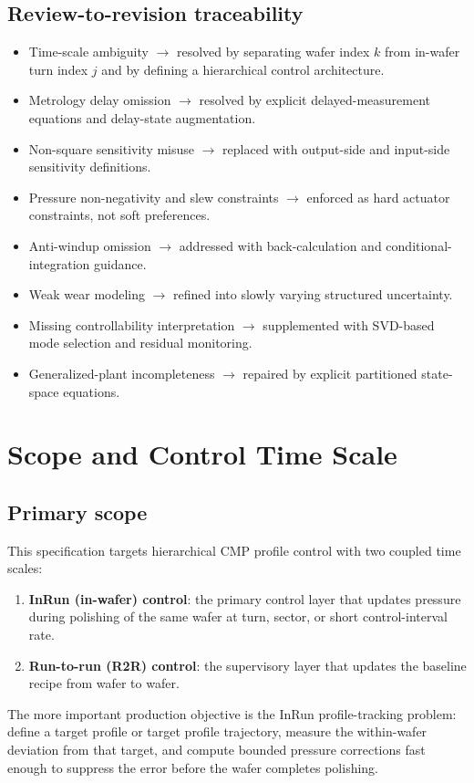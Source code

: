 \documentclass[11pt,a4paper]{article}
\begin{document}
\subsection{Review-to-revision traceability}
\begin{itemize}[leftmargin=1.5em]
\item Time-scale ambiguity $\rightarrow$ resolved by separating wafer index $k$ from in-wafer turn index $j$ and by defining a hierarchical control architecture.
\item Metrology delay omission $\rightarrow$ resolved by explicit delayed-measurement equations and delay-state augmentation.
\item Non-square sensitivity misuse $\rightarrow$ replaced with output-side and input-side sensitivity definitions.
\item Pressure non-negativity and slew constraints $\rightarrow$ enforced as hard actuator constraints, not soft preferences.
\item Anti-windup omission $\rightarrow$ addressed with back-calculation and conditional-integration guidance.
\item Weak wear modeling $\rightarrow$ refined into slowly varying structured uncertainty.
\item Missing controllability interpretation $\rightarrow$ supplemented with SVD-based mode selection and residual monitoring.
\item Generalized-plant incompleteness $\rightarrow$ repaired by explicit partitioned state-space equations.\end{itemize}

\section{Scope and Control Time Scale}
\subsection{Primary scope}
This specification targets hierarchical CMP profile control with two coupled time scales:
\begin{enumerate}[leftmargin=1.6em]
\item \textbf{InRun (in-wafer) control}: the primary control layer that updates pressure during polishing of the same wafer at turn, sector, or short control-interval rate.
\item \textbf{Run-to-run (R2R) control}: the supervisory layer that updates the baseline recipe from wafer to wafer.
\end{enumerate}
The more important production objective is the InRun profile-tracking problem: define a target profile or target profile trajectory, measure the within-wafer deviation from that target, and compute bounded pressure corrections fast enough to suppress the error before the wafer completes polishing.
\end{document}
